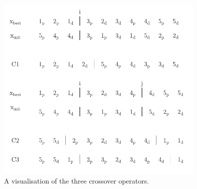     \begin{figure}[!hb]
        \centering
        \includegraphics[width=0.9\textwidth]{figures/crossover.pdf}
        \caption{A visualisation of the three crossover operators.}
        \label{fig:crossover}
    \end{figure}
    
